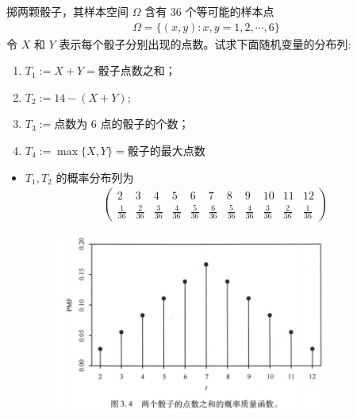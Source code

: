 \begin{frame}{}
	\begin{exam}
		掷两颗骰子，其样本空间 $\Omega$ 含有 36 个等可能的样本点
		\begin{eqnarray*}
			\Omega=\{(x,y):x,y=1,2,\cdots,6\}
		\end{eqnarray*}
		令 $X$ 和 $Y$ 表示每个骰子分别出现的点数。试求下面随机变量的分布列: %
		\begin{enumerate}[<+-|alert@+>]
			\item $T_1:=X+Y=\mbox{骰子点数之和}$；
			\item $T_2:=14-(X+Y)$;
			\item $T_3:=\mbox{点数为 6 点的骰子的个数}$；
			\item $T_4:=\max\{X, Y\}=\mbox{骰子的最大点数}$
		\end{enumerate}

	\end{exam}
\end{frame}

\begin{frame}
	\begin{itemize}[<+-|alert@+>]
		\item $T_1, T_2$ 的概率分布列为 \pause
		      \begin{eqnarray*}
			      \left(\begin{array}{ccccccccccc}
				      2            & 3            & 4            & 5            & 6            & 7            & 8            & 9            & 10           & 11           & 12           \\
				      \frac{1}{36} & \frac{2}{36} & \frac{3}{36} & \frac{4}{36} & \frac{5}{36} & \frac{6}{36} & \frac{5}{36} & \frac{4}{36} & \frac{3}{36} & \frac{2}{36} & \frac{1}{36}
			      \end{array}\right)
		      \end{eqnarray*}
		      \pause
		      \begin{figure}[图 3.4.png]
			      \centering
			      \includegraphics[width=9cm]{figures/Fig3.4.png}
		      \end{figure}

	\end{itemize}

\end{frame}

